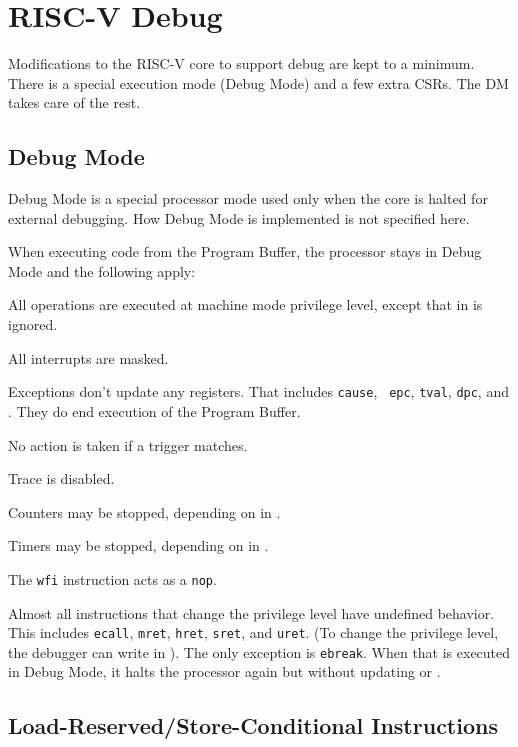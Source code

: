 \chapter{RISC-V Debug}
\label{sec:core_debug}

Modifications to the RISC-V core to support debug are kept to a minimum.  There
is a special execution mode (Debug Mode) and a few extra CSRs. The DM takes care
of the rest.

\section{Debug Mode} \label{debugmode}

Debug Mode is a special processor mode used only when the core is halted for
external debugging. How Debug Mode is implemented is not specified here.

\begin{steps}{When executing code from the Program Buffer, the processor stays
    in Debug Mode and the following apply:}
\item All operations are executed at machine mode privilege level, except that
    \Fmprv in \Rmstatus is ignored.
\item All interrupts are masked.
\item Exceptions don't update any registers.  That includes {\tt cause}, {\tt
    epc}, {\tt tval}, {\tt dpc}, and \Rmstatus. They do end execution of the
    Program Buffer.
\item No action is taken if a trigger matches.
\item Trace is disabled.
\item Counters may be stopped, depending on \Fstopcount in \Rdcsr.
\item Timers may be stopped, depending on \Fstoptime in \Rdcsr.
\item The {\tt wfi} instruction acts as a {\tt nop}.
\item Almost all instructions that change the privilege level have undefined
    behavior.  This includes {\tt ecall}, {\tt mret}, {\tt hret}, {\tt sret},
    and {\tt uret}.  (To change the privilege level, the debugger can write
    \Fprv in \Rdcsr). The only exception is {\tt ebreak}. When that is executed
    in Debug Mode, it halts the processor again but without updating \Rdpc or \Rdcsr.
\end{steps}

\section{Load-Reserved/Store-Conditional Instructions}

